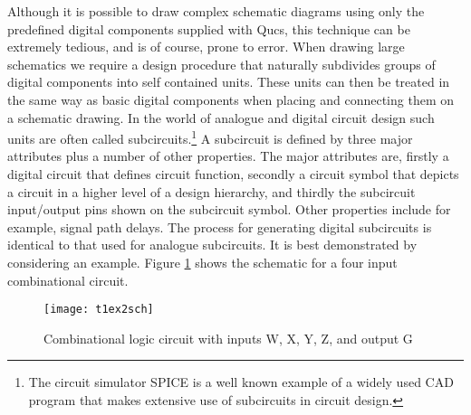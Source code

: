 
Although it is possible to draw complex schematic diagrams using only
the predefined digital components supplied with Qucs, this technique
can be extremely tedious, and is of course, prone to error.  When
drawing large schematics we require a design procedure that naturally
subdivides groups of digital components into self contained units.
These units can then be treated in the same way as basic digital
components when placing and connecting them on a schematic drawing.
In the world of analogue and digital circuit design such units are
often called subcircuits.\footnote{The circuit simulator SPICE is a
well known example of a widely used CAD program that makes extensive
use of subcircuits in circuit design.}  A subcircuit is defined by
three major attributes plus a number of other properties. The major
attributes are, firstly a digital circuit that defines circuit
function, secondly a circuit symbol that depicts a circuit in a higher
level of a design hierarchy, and thirdly the subcircuit input/output
pins shown on the subcircuit symbol.  Other properties include for
example, signal path delays. The process for generating digital
subcircuits is identical to that used for analogue subcircuits.  It is
best demonstrated by considering an example.  Figure
\ref{fig:t1ex2sch} shows the schematic for a four input combinational
circuit.

\begin{figure}
  \centering
  \texttt{[image: t1ex2sch]}
  \caption{Combinational logic circuit with inputs W, X, Y, Z, and output G}
  \label{fig:t1ex2sch}
\end{figure}
\FloatBarrier

